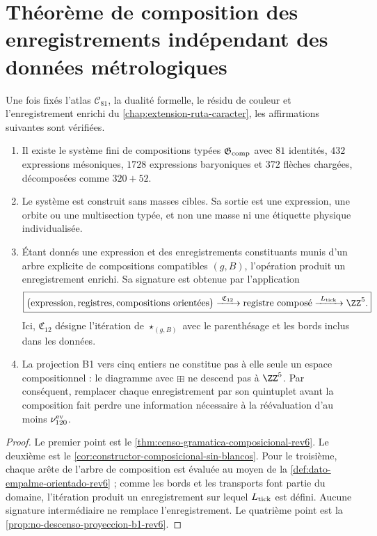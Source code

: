 \section{Théorème de composition des enregistrements indépendant des données métrologiques}
\label{sec:teorema-composicional-sin-blancos-rev6}

\begin{theorem}
\label{thm:cierre-composicional-sin-blancos-rev6} Une fois fixés l’atlas \(\mathcal C_{81}\), la dualité formelle, le résidu de couleur et l’enregistrement enrichi du \cref{chap:extension-ruta-caracter}, les affirmations suivantes sont vérifiées.
\begin{enumerate}
 \item Il existe le système fini de compositions typées \(\mathfrak G_{\rm comp}\) avec \(81\) identités, \(432\) expressions mésoniques, \(1728\) expressions baryoniques et \(372\) flèches chargées, décomposées comme \(320+52\).

 \item Le système est construit sans masses cibles. Sa sortie est une expression, une orbite ou une multisection typée, et non une masse ni une étiquette physique individualisée.

 \item Étant donnés une expression et des enregistrements constituants munis d’un arbre explicite de compositions compatibles \((g,B)\), l’opération produit un enregistrement enrichi. Sa signature est obtenue par l’application
 \[
 \boxed{
 \bigl(
 \text{expression},
 \text{registres},
 \text{compositions orientées}
 \bigr)
 \xrightarrow{\ \mathfrak C_{12}\ }
 \text{registre composé}
 \xrightarrow{\ L_{\rm tick}\ }
 \ZZ^5.}
 \]
 Ici, \(\mathfrak C_{12}\) désigne l’itération de \(\star_{(g,B)}\) avec le parenthésage et les bords inclus dans les données.

 \item La projection B1 vers cinq entiers ne constitue pas à elle seule un espace compositionnel : le diagramme avec \(\boxplus\) ne descend pas à \(\ZZ^5\). Par conséquent, remplacer chaque enregistrement par son quintuplet avant la composition fait perdre une information nécessaire à la réévaluation d’au moins \(\nu_{120}^{\rm ev}\).
\end{enumerate}
\end{theorem}

\begin{proof}
Le premier point est le \cref{thm:censo-gramatica-composicional-rev6}. Le deuxième est le \cref{cor:constructor-composicional-sin-blancos}. Pour le troisième, chaque arête de l’arbre de composition est évaluée au moyen de la \cref{def:dato-empalme-orientado-rev6} ; comme les bords et les transports font partie du domaine, l’itération produit un enregistrement sur lequel \(L_{\rm tick}\) est défini. Aucune signature intermédiaire ne remplace l’enregistrement. Le quatrième point est la \cref{prop:no-descenso-proyeccion-b1-rev6}.
\end{proof}

